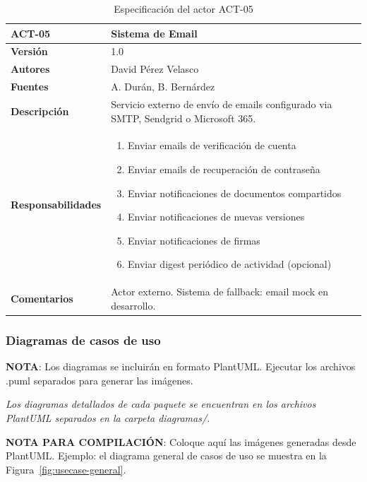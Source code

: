 \documentclass[11pt, a4paper]{article}
\begin{document}
\begin{table}[H]
    \centering
    \small
    \begin{tabular}{|p{4cm}|p{10cm}|}
    \hline
    \textbf{ACT-05} & Sistema de Email \\
    \hline
    \textbf{Versión} & 1.0 \\
    \hline
    \textbf{Autores} & David Pérez Velasco \\
    \hline
    \textbf{Fuentes} & A. Durán, B. Bernárdez \\
    \hline
    \textbf{Descripción} & Servicio externo de envío de emails configurado via SMTP, Sendgrid o Microsoft 365. \\
    \hline
    \textbf{Responsabilidades} & 
    \begin{enumerate}
        \item Enviar emails de verificación de cuenta
        \item Enviar emails de recuperación de contraseña
        \item Enviar notificaciones de documentos compartidos
        \item Enviar notificaciones de nuevas versiones
        \item Enviar notificaciones de firmas
        \item Enviar digest periódico de actividad (opcional)
    \end{enumerate} \\
    \hline
    \textbf{Comentarios} & Actor externo. Sistema de fallback: email mock en desarrollo. \\
    \hline
    \end{tabular}
    \caption{Especificación del actor ACT-05}
\end{table}

\subsubsection{Diagramas de casos de uso}

\textbf{NOTA}: Los diagramas se incluirán en formato PlantUML. Ejecutar los archivos .puml separados para generar las imágenes.



\textit{Los diagramas detallados de cada paquete se encuentran en los archivos PlantUML separados en la carpeta diagramas/.}

\textbf{NOTA PARA COMPILACIÓN}: Coloque aquí las imágenes generadas desde PlantUML. Ejemplo: el diagrama general de casos de uso se muestra en la Figura~\ref{fig:usecase-general}.
\end{document}

